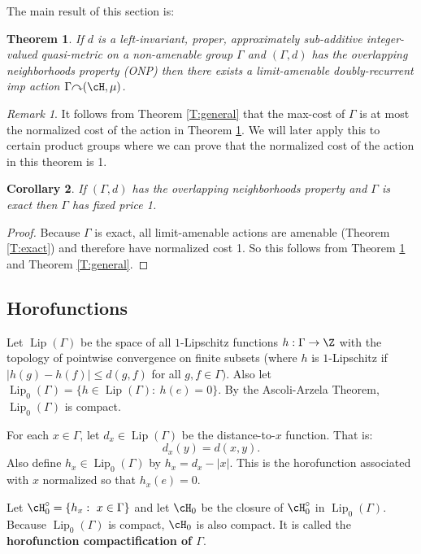 \documentclass[12pt]{article}
\theoremstyle{plain}
\newtheorem{thm}{Theorem}[section]
\newtheorem{cor}[thm]{Corollary}
\theoremstyle{definition}
\theoremstyle{remark}
\newtheorem{remark}{Remark}
\newcommand{\G}{\Gamma}
\newcommand\Lip{\operatorname{Lip}}
\def\cc{{\curvearrowright}}
\begin{document}
The main result of this section is:

\begin{thm}\label{T:metric-group}
   If $d$ is a left-invariant, proper, approximately sub-additive integer-valued quasi-metric on a non-amenable group $\G$ and $(\G,d)$ has the overlapping neighborhoods property (ONP) then there exists a limit-amenable doubly-recurrent imp action $\G \cc (\cH,\mu)$.
\end{thm}

\begin{remark}
It follows from Theorem \ref{T:general} that the max-cost of $\G$ is at most the normalized cost of the action in Theorem \ref{T:metric-group}. We will later apply this to certain product groups where we can prove that the normalized cost of the action in this theorem is 1.
\end{remark}

\begin{cor}
    If $(\G,d)$ has the overlapping neighborhoods property and $\G$ is exact then $\G$ has fixed price 1.
\end{cor}

\begin{proof}
Because $\G$ is exact, all limit-amenable actions are amenable (Theorem \ref{T:exact}) and therefore have normalized cost 1. So this follows from Theorem \ref{T:metric-group} and Theorem \ref{T:general}.    
\end{proof}




\subsection{Horofunctions}

Let $\Lip(\G)$ be the space of all $1$-Lipschitz functions $h:\G \to \Z$ with the topology of pointwise convergence on finite subsets (where $h$ is $1$-Lipschitz if $|h(g)-h(f)|\le d(g,f)$ for all $g,f \in \G)$. Also let $\Lip_0(\G)=\{h\in \Lip(\G):~h(e)=0\}$. By the Ascoli-Arzela Theorem, $\Lip_0(\G)$ is compact.

For each $x\in \G$, let $d_x \in \Lip(\G)$ be the distance-to-$x$ function. That is:
$$d_x(y)=d(x,y).$$
Also define $h_x \in \Lip_0(\G)$ by $h_x=d_x-|x|$. This is the horofunction associated with $x$ normalized so that $h_x(e)=0$.  

Let $\cH^{\circ}_0=\{h_x:~x\in \G\}$ and let $\cH_0$ be the closure of  $\cH^\circ_0$ in $\Lip_0(\G)$. Because $\Lip_0(\G)$ is compact, $\cH_0$ is also compact. It is called the {\bf horofunction compactification of $\G$}. 
\end{document}
